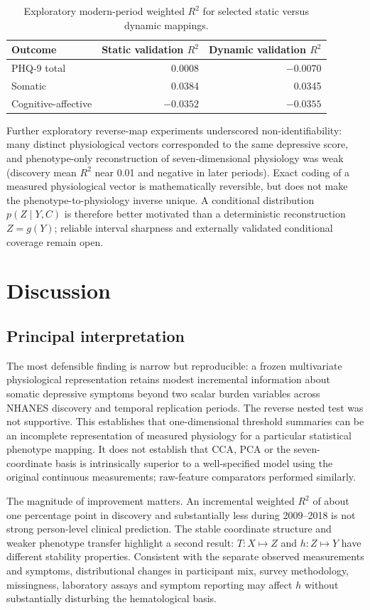 \documentclass[11pt,a4paper]{article}
\newcommand{\Rtwo}{R^{2}}
\begin{document}
\begin{table}[htbp]\centering\small
\caption{Exploratory modern-period weighted $\Rtwo$ for selected static versus dynamic mappings.}
\label{tab:complexity}
\begin{tabular}{lrr}\toprule
Outcome & Static validation $\Rtwo$ & Dynamic validation $\Rtwo$\\\midrule
PHQ-9 total & 0.0008 & $-0.0070$\\
Somatic & 0.0384 & 0.0345\\
Cognitive-affective & $-0.0352$ & $-0.0355$\\\bottomrule
\end{tabular}
\end{table}

Further exploratory reverse-map experiments underscored non-identifiability: many distinct physiological vectors corresponded to the same depressive score, and phenotype-only reconstruction of seven-dimensional physiology was weak (discovery mean $\Rtwo$ near 0.01 and negative in later periods). Exact coding of a measured physiological vector is mathematically reversible, but does not make the phenotype-to-physiology inverse unique. A conditional distribution $p(Z\mid Y,C)$ is therefore better motivated than a deterministic reconstruction $Z=g(Y)$; reliable interval sharpness and externally validated conditional coverage remain open.

\section{Discussion}
\subsection{Principal interpretation}
The most defensible finding is narrow but reproducible: a frozen multivariate physiological representation retains modest incremental information about somatic depressive symptoms beyond two scalar burden variables across NHANES discovery and temporal replication periods. The reverse nested test was not supportive. This establishes that one-dimensional threshold summaries can be an incomplete representation of measured physiology for a particular statistical phenotype mapping. It does not establish that CCA, PCA or the seven-coordinate basis is intrinsically superior to a well-specified model using the original continuous measurements; raw-feature comparators performed similarly.

The magnitude of improvement matters. An incremental weighted $\Rtwo$ of about one percentage point in discovery and substantially less during 2009--2018 is not strong person-level clinical prediction. The stable coordinate structure and weaker phenotype transfer highlight a second result: $T:X\mapsto Z$ and $h:Z\mapsto Y$ have different stability properties. Consistent with the separate observed measurements and symptoms, distributional changes in participant mix, survey methodology, missingness, laboratory assays and symptom reporting may affect $h$ without substantially disturbing the hematological basis.
\end{document}
